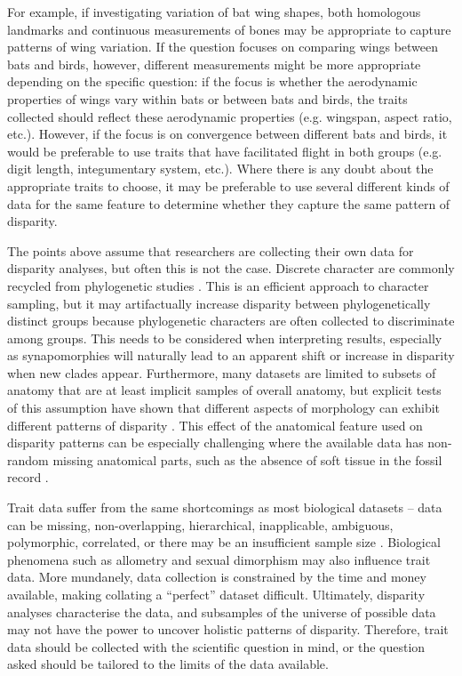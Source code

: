 \documentclass[12pt,letterpaper]{article}
\begin{document}
For example, if investigating variation of bat wing shapes, both homologous landmarks and continuous measurements of bones may be appropriate to capture patterns of wing variation.
If the question focuses on comparing wings between bats and birds, however, different measurements might be more appropriate depending on the specific question: if the focus is whether the aerodynamic properties of wings vary within bats or between bats and birds, the traits collected should reflect these aerodynamic properties (e.g. wingspan, aspect ratio, etc.).
However, if the focus is on convergence between different bats and birds, it would be preferable to use traits that have facilitated flight in both groups (e.g. digit length, integumentary system, etc.).
Where there is any doubt about the appropriate traits to choose, it may be preferable to use several different kinds of data for the same feature to determine whether they capture the same pattern of disparity.

The points above assume that researchers are collecting their own data for disparity analyses, but often this is not the case.
Discrete character are commonly recycled from phylogenetic studies \citep[e.g.][]{Brusatte2008-fx,Close2015-qi,Wright2017-jo}.
This is an efficient approach to character sampling, but it may artifactually increase disparity between phylogenetically distinct groups because phylogenetic characters are often collected to discriminate among groups.
This needs to be considered when interpreting results, especially as synapomorphies will naturally lead to an apparent shift or increase in disparity when new clades appear.
Furthermore, many datasets are limited to subsets of anatomy that are at least implicit samples of overall anatomy, but explicit tests of this assumption have shown that different aspects of morphology can exhibit different patterns of disparity \citep{Hopkins2017-cf}.
This effect of the anatomical feature used on disparity patterns can be especially challenging where the available data has non-random missing anatomical parts, such as the absence of soft tissue in the fossil record \citep{Deline2018-le}.

Trait data suffer from the same shortcomings as most biological datasets -- data can be missing, non-overlapping, hierarchical, inapplicable, ambiguous, polymorphic, correlated, or there may be an insufficient sample size \citep{Brazeau2017-kg, Palci2018-ni}.
Biological phenomena such as allometry and sexual dimorphism may also influence trait data.
More mundanely, data collection is constrained by the time and money available, making collating a ``perfect'' dataset difficult.
Ultimately, disparity analyses characterise the data, and subsamples of the universe of possible data may not have the power to uncover holistic patterns of disparity.
Therefore, trait data should be collected with the scientific question in mind, or the question asked should be tailored to the limits of the data available.
\end{document}

